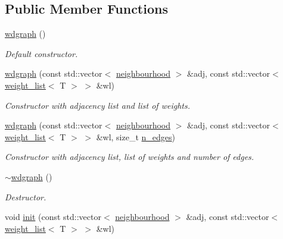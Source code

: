 \subsection*{Public Member Functions}
\begin{DoxyCompactItemize}
\item 
\mbox{\label{classlgraph_1_1wdgraph_af381df59a5f5504670f157b06ecdcdea}} 
\hyperlink{classlgraph_1_1wdgraph_af381df59a5f5504670f157b06ecdcdea}{wdgraph} ()
\begin{DoxyCompactList}\small\item\em Default constructor. \end{DoxyCompactList}\item 
\hyperlink{classlgraph_1_1wdgraph_a80abe8c4fc1312f56e82a71d361b337f}{wdgraph} (const std\+::vector$<$ \hyperlink{namespacelgraph_a052e7766c13f3a43cec0aec8173fdede}{neighbourhood} $>$ \&adj, const std\+::vector$<$ \hyperlink{namespacelgraph_a1e0fd5ef0a78b2a92da48adbed265cb6}{weight\+\_\+list}$<$ T $>$ $>$ \&wl)
\begin{DoxyCompactList}\small\item\em Constructor with adjacency list and list of weights. \end{DoxyCompactList}\item 
\hyperlink{classlgraph_1_1wdgraph_ad76940eece0a10a99e684a8896ac2669}{wdgraph} (const std\+::vector$<$ \hyperlink{namespacelgraph_a052e7766c13f3a43cec0aec8173fdede}{neighbourhood} $>$ \&adj, const std\+::vector$<$ \hyperlink{namespacelgraph_a1e0fd5ef0a78b2a92da48adbed265cb6}{weight\+\_\+list}$<$ T $>$ $>$ \&wl, size\+\_\+t \hyperlink{classlgraph_1_1xxgraph_af00bce8b07a42754601d1e3bebe2c1fa}{n\+\_\+edges})
\begin{DoxyCompactList}\small\item\em Constructor with adjacency list, list of weights and number of edges. \end{DoxyCompactList}\item 
\mbox{\label{classlgraph_1_1wdgraph_a1364d5edcfdbec98623148777f9ff163}} 
\hyperlink{classlgraph_1_1wdgraph_a1364d5edcfdbec98623148777f9ff163}{$\sim$wdgraph} ()
\begin{DoxyCompactList}\small\item\em Destructor. \end{DoxyCompactList}\item 
void \hyperlink{classlgraph_1_1wdgraph_a0c3bbc5f54169acb294c636836c83047}{init} (const std\+::vector$<$ \hyperlink{namespacelgraph_a052e7766c13f3a43cec0aec8173fdede}{neighbourhood} $>$ \&adj, const std\+::vector$<$ \hyperlink{namespacelgraph_a1e0fd5ef0a78b2a92da48adbed265cb6}{weight\+\_\+list}$<$ T $>$ $>$ \&wl)

\end{DoxyCompactItemize}
